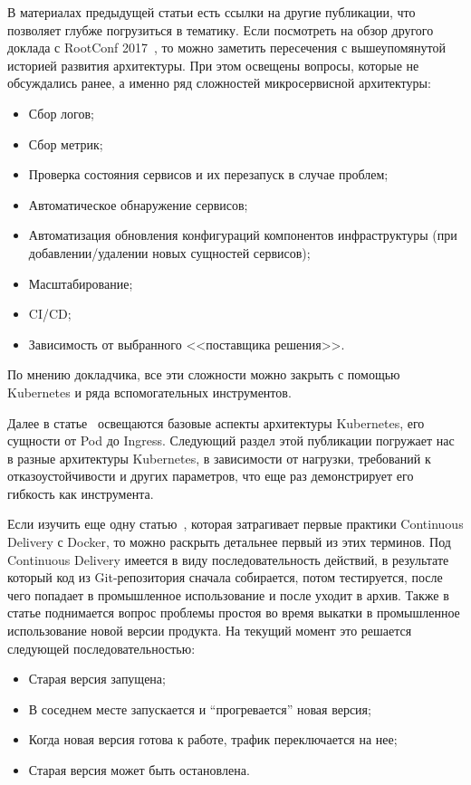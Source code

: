 В материалах предыдущей статьи есть ссылки на другие публикации, что позволяет глубже погрузиться в тематику. Если посмотреть на обзор другого доклада с RootConf 2017~\cite{habr:flant:k8s-small-projects}, то можно заметить пересечения с вышеупомянутой историей развития архитектуры. При этом освещены вопросы, которые не обсуждались ранее, а именно ряд сложностей микросервисной архитектуры:
\begin{itemize}
    \item Сбор логов;
    \item Сбор метрик;
    \item Проверка состояния сервисов и их перезапуск в случае проблем;
    \item Автоматическое обнаружение сервисов;
    \item Автоматизация обновления конфигураций компонентов инфраструктуры (при добавлении/удалении новых сущностей сервисов);
    \item Масштабирование;
    \item CI/CD;
    \item Зависимость от выбранного <<поставщика решения>>.
\end{itemize}

По мнению докладчика, все эти сложности можно закрыть с помощью Kubernetes и ряда вспомогательных инструментов.

Далее в статье~\cite{habr:flant:k8s-small-projects} освещаются базовые аспекты архитектуры Kubernetes, его сущности от Pod до Ingress. Следующий раздел этой публикации погружает нас в разные архитектуры Kubernetes, в зависимости от нагрузки, требований к отказоустойчивости и других параметров, что еще раз демонстрирует его гибкость как инструмента.

Если изучить еще одну статью~\cite{habr:flant:cd-docker}, которая затрагивает первые практики Continuous Delivery с Docker, то можно раскрыть детальнее первый из этих терминов. Под Continuous Delivery имеется в виду последовательность действий, в результате который код из Git-репозитория сначала собирается, потом тестируется, после чего попадает в промышленное использование и после уходит в архив. Также в статье поднимается вопрос проблемы простоя во время выкатки в промышленное использование новой версии продукта. На текущий момент это решается следующей последовательностью:
\begin{itemize}
    \item Старая версия запущена;
    \item В соседнем месте запускается и “прогревается” новая версия;
    \item Когда новая версия готова к работе, трафик переключается на нее;
    \item Старая версия может быть остановлена.
\end{itemize}

